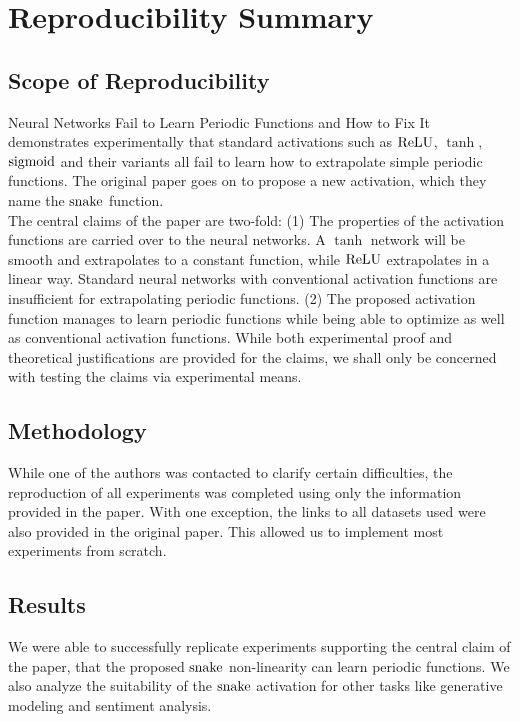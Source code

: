 \section*{\centering Reproducibility Summary}

\subsection*{Scope of Reproducibility}

Neural Networks Fail to Learn Periodic Functions and How to Fix It \cite{ziyin2020neural} demonstrates experimentally that standard activations such as \( \operatorname{ReLU} \), \( \tanh \), \( \operatorname{sigmoid} \) and their variants all fail to learn how to extrapolate simple periodic functions. The original paper goes on to propose a new activation, which they name the $\operatorname{snake}$ function. \\
 
The central claims of the paper are two-fold: (1) The properties of the activation functions are carried over to the neural networks. A \( \tanh \) network will be smooth and extrapolates to a constant function, while \( \operatorname{ReLU} \) extrapolates in a linear way. Standard neural networks with conventional activation functions are insufficient for extrapolating periodic functions. (2) The proposed activation function manages to learn periodic functions while being able to optimize as well as conventional activation functions. While both experimental proof and theoretical justifications are provided for the claims, we shall only be concerned with testing the claims via experimental means.

\subsection*{Methodology}

While one of the authors was contacted to clarify certain difficulties, the reproduction of all experiments was completed using only the information provided in the paper.
With one exception, the links to all datasets used were also provided in the original paper. This allowed us to implement most experiments from scratch.

\subsection*{Results}

We were able to successfully replicate experiments supporting the central claim of the paper, that the proposed \( \operatorname{snake} \) non-linearity can learn periodic functions. We also analyze the suitability of the \( \operatorname{snake} \) activation for other tasks like generative modeling and sentiment analysis.



